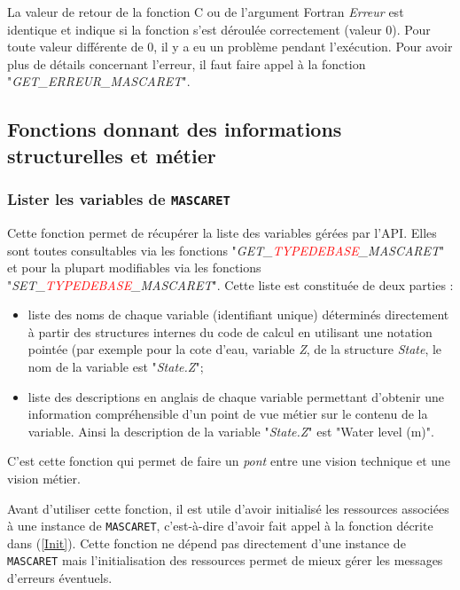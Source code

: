 \documentclass[a4paper,11pt]{article}
\begin{document}
\vspace{0.5cm}

 La valeur de retour de la fonction C ou de l'argument Fortran \textit{Erreur} est identique et indique si la fonction s'est d\'eroul\'ee correctement (valeur 0). Pour toute valeur diff\'erente de 0, il y a eu un probl\`eme pendant l'ex\'ecution. Pour avoir plus de d\'etails concernant l'erreur, il faut faire appel \`a la fonction "\textit{GET\_ERREUR\_MASCARET}".

\subsection{Fonctions donnant des informations structurelles et m\'etier}

\subsubsection{Lister les variables de \texttt{MASCARET}}

 Cette fonction permet de r\'ecup\'erer la liste des variables g\'er\'ees par l'API. Elles sont toutes consultables via les fonctions "\textit{GET\_\textcolor{red}{TYPEDEBASE}\_MASCARET}" et pour la plupart modifiables via les fonctions "\textit{SET\_\textcolor{red}{TYPEDEBASE}\_MASCARET}". Cette liste est constitu\'ee de deux parties :

 \begin{itemize}
    \item liste des noms de chaque variable (identifiant unique) d\'etermin\'es directement \`a partir des structures internes du code de calcul en utilisant une notation point\'ee (par exemple pour la cote d'eau, variable \textit{Z}, de la structure \textit{State}, le nom de la variable est "\textit{State.Z}";
    \item liste des descriptions en anglais de chaque variable permettant d'obtenir une information compr\'ehensible d'un point de vue m\'etier sur le contenu de la variable. Ainsi la description de la variable "\textit{State.Z}" est "Water level (m)".
 \end{itemize}

\vspace{0.5cm}

 C'est cette fonction qui permet de faire un \emph{pont} entre une vision technique et une vision m\'etier.
 
 \vspace{0.5cm}
 
 Avant d'utiliser cette fonction, il est utile d'avoir initialis\'e les ressources associ\'ees \`a une instance de \texttt{MASCARET}, c'est-\`a-dire d'avoir fait appel \`a la fonction d\'ecrite dans (\ref{Init}). Cette fonction ne d\'epend pas directement d'une instance de \texttt{MASCARET} mais l'initialisation des ressources permet de mieux g\'erer les messages d'erreurs \'eventuels.
 
\end{document}
